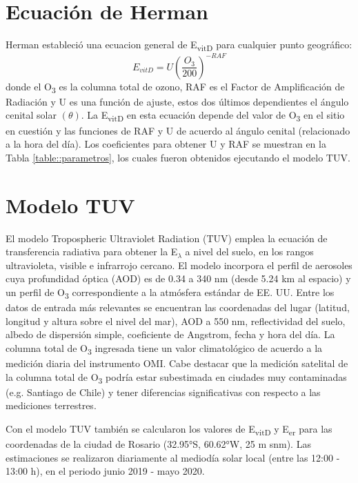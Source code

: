 \documentclass[10pt,twocolumn]{article}
\begin{document}
\section{Ecuación de Herman}
Herman\cite{Herman2010} estableció una ecuacion general de E\textsubscript{vitD} para cualquier punto geográfico:
\begin{equation}
  E_{vitD}=U\left(\frac{O_3}{200}\right)^{-RAF}
  \label{eq:evitd}
\end{equation}
donde el O\textsubscript{3} es la columna total de ozono, RAF es el Factor de Amplificación de Radiación y U es una función de ajuste, estos dos últimos dependientes el ángulo cenital solar $(\theta)$. La E\textsubscript{vitD} en esta ecuación depende del valor de O\textsubscript{3} en el sitio en cuestión y las funciones de RAF y U de acuerdo al ángulo cenital (relacionado a la hora del día). Los coeficientes para obtener U y RAF se muestran en la Tabla \ref{table::parametros}, los cuales fueron obtenidos ejecutando el modelo TUV.

\section{Modelo TUV}
El modelo Tropospheric Ultraviolet Radiation (TUV) emplea la ecuación de transferencia radiativa para obtener la E$_\lambda$ a nivel del suelo, en los rangos ultravioleta, visible e infrarrojo cercano. El modelo incorpora el perfil de aerosoles cuya profundidad óptica (AOD) es de 0.34 a 340 nm (desde 5.24 km al espacio) y un perfil de O\textsubscript{3} correspondiente a la atmósfera estándar de EE. UU. Entre los datos de entrada más relevantes se encuentran las coordenadas del lugar (latitud, longitud y altura sobre el nivel del mar), AOD a 550 nm, reflectividad del suelo, albedo de dispersión simple, coeficiente de Angstrom, fecha y hora del día. La columna total de O\textsubscript{3} ingresada tiene un valor climatológico de acuerdo a la medición diaria del instrumento OMI. Cabe destacar que la medición satelital de la columna total de O\textsubscript{3} podría estar subestimada en ciudades muy contaminadas (e.g. Santiago de Chile) y tener diferencias significativas con respecto a las mediciones terrestres.

Con el modelo TUV también se calcularon los valores de E\textsubscript{vitD} y E\textsubscript{er} para las coordenadas de la ciudad de Rosario (32.95°S, 60.62°W, 25 m snm). Las estimaciones se realizaron diariamente al mediodía solar local (entre las 12:00 - 13:00 h), en el periodo junio 2019 - mayo 2020.
\end{document}
